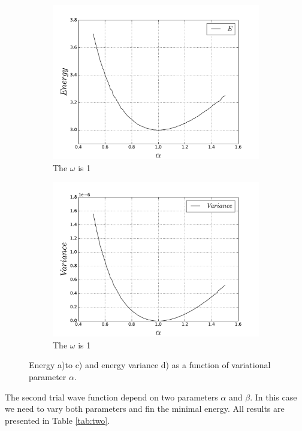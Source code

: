 \documentclass[10pt]{article}
\begin{document}
\begin{figure}[h!]
\begin{subfigure}[b]{0.6\linewidth}
    \centering
    \includegraphics[width=1.1\linewidth]{energy_on_alpha_1} 
    \caption{The $\omega$ is 1} 
    \label{fig1:c} 
  \end{subfigure}%
  \begin{subfigure}[b]{0.6\linewidth}
    \centering
    \includegraphics[width=1.1\linewidth]{variance_on_alpha} 
    \caption{The $\omega$ is 1} 
    \label{fig1:d} 
  \end{subfigure} 
  \caption{ Energy a)to c) and energy variance d) as a function of variational parameter $\alpha$.}
  \label{fig1} 
\end{figure}

The second trial wave function depend on two parameters $\alpha$ and $\beta$. In this case we need to vary both parameters and fin the minimal energy. All results are presented in Table \ref{tab:two}.
\end{document}
